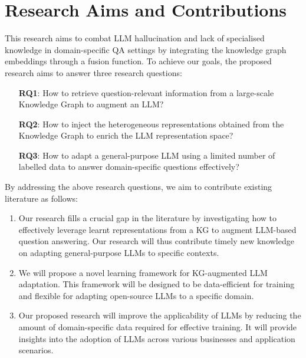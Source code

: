 \section*{Research Aims and Contributions}

This research aims to combat LLM hallucination and lack of specialised knowledge in domain-specific QA settings by integrating the knowledge graph embeddings through a fusion function. 
To achieve our goals, the proposed research aims to answer three research questions: 
\vspace{-0.5cm}
\begin{itemize}
    \item[\textbf{RQ1}:] How to retrieve question-relevant information from a large-scale Knowledge Graph to augment an LLM?
    \item[\textbf{RQ2}:] How to inject the heterogeneous representations obtained from the Knowledge Graph to enrich the LLM representation space?
    \item[\textbf{RQ3}:] How to adapt a general-purpose LLM using a limited number of labelled data to answer domain-specific questions effectively?
\end{itemize}
\vspace{-0.3cm}

By addressing the above research questions, we aim to contribute existing literature as follows:\vspace{-0.3cm}
\begin{enumerate}
    \item Our research fills a crucial gap in the literature by investigating how to effectively leverage learnt representations from a KG to augment LLM-based question answering. Our research will thus contribute timely new knowledge on adapting general-purpose LLMs to specific contexts.

    \item We will propose a novel learning framework for KG-augmented LLM adaptation. This framework will be designed to be data-efficient for training and flexible for adapting open-source LLMs to a specific domain.

    \item Our proposed research will improve the applicability of LLMs by reducing the amount of domain-specific data required for effective training. It will provide insights into the adoption of LLMs across various businesses and application scenarios.
    
\end{enumerate}

